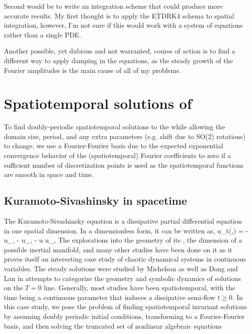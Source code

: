Second would be to write an integration scheme that could produce more accurate results. My first thought is to apply the ETDRK4 schema to spatial integration, however, I'm not sure if this would work with a system of equations rather than a single PDE.

Another possible, yet dubious and not warranted, course of action is to find a different way to apply damping in the equations, as the steady growth of the Fourier amplitudes is the main cause of all of my problems.


\section{Spatiotemporal solutions of \KS}
\label{sect:BeginningsPaper}
To find doubly-periodic spatiotemporal solutions to the \KSe while allowing the domain size,
period, and any extra parameters (e.g. shift due to SO(2) rotations) to change, we use a Fourier-Fourier
basis due to the expected exponential convergence behavior of the (spatiotemporal) Fourier coefficients to zero
if a sufficient number of discretization points is used as the spatiotemporal functions are smooth in space
and time.

\subsection{Kuramoto-Sivashinsky in spacetime}
The Kuramoto-Sivashinsky equation is a dissipative partial differential
equation in one spatial dimension.
In a dimensionless form, it can be written as,
\beq
u_t(\conf,\zeit)
= -u_{\conf \conf \conf \conf,\zeit} - u_{\conf \conf,\zeit} - u u_{\conf,\zeit}
\eeq
The explorations into the geometry of its {\statesp}, the
dimension of a possible inertial manifold, and many other
studies have been done on it as it proves itself an interesting case
study of chaotic dynamical systems in continuous variables. The steady
solutions were studied by Michelson as well as Dong and
Lan in attempts to categorize the geometry and symbolic
dynamics of solutions on the $T=0$ line. Generally, most studies have
been spatiotemporal, with the time being a continuous parameter that
induces a dissipative semi-flow $t \geq 0$. In this case study, we pose
the problem of finding spatiotemporal invariant solutions by assuming
doubly periodic initial conditions, transforming to a Fourier-Fourier
basis, and then solving the truncated set of nonlinear algebraic
equations

